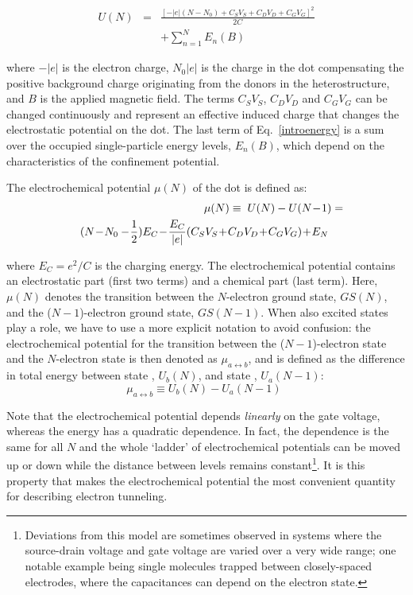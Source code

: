 \documentclass[12pt,aps,nofootinbib]{revtex4-1}
\begin{document}
\begin{eqnarray}
U(N) &=& \frac{[-|e|(N\!-\!N_0) + C_S V_{S}+C_D V_{D}+ C_G V_G]^2}{2C} \nonumber \\
&&+ \sum_{n=1}^N E_n(B) \label{introenergy}
\end{eqnarray}

\noindent where $-|e|$ is the electron charge, $N_0 |e|$ is the charge in the dot compensating the positive background charge originating from the donors in the heterostructure, and $B$ is the applied magnetic field. The terms $C_S V_{S}$, $C_D V_{D}$ and $C_G V_G$ can be changed continuously and represent an effective induced charge that changes the electrostatic potential on the dot. The last term of Eq.~\ref{introenergy} is a sum over the occupied single-particle energy levels, $E_n(B)$, which depend on the characteristics of the confinement potential.

The electrochemical potential $\mu(N)$ of the dot is defined as:
\begin{eqnarray}
&&\mu(N) \equiv \hspace{0.1cm} U(N) - U(N\!-\!1)= \nonumber \\
 &&(N\!-\! N_0 -\!\frac{1}{2})E_C\! -\! \frac{E_C}{|e|}
(C_S V_{S}\!+\! C_D V_{D}\! +\! C_G V_G)\! +\! E_N \ \ \ \ 
\label{mu}
\end{eqnarray}

\noindent where $E_C=e^2/C$ is the charging energy. The
electrochemical potential contains an electrostatic part (first
two terms) and a chemical part (last term). Here, $\mu(N)$ denotes
the transition between the $N$-electron ground state, $GS(N)$, and
the ($N\!-\!1$)-electron ground state, $GS(N\!-\!1)$. When also
excited states play a role, we have to use a more explicit
notation to avoid confusion: the electrochemical potential for the
transition between the ($N-1$)-electron state \ket{\:a} and the
$N$-electron state  is then denoted as
$\mu_{a\leftrightarrow b}$, and is defined as the difference in
total energy between state \ket{\:b}, $U_b(N)$, and state
, $U_a(N\!-\!1)$:
\begin{equation}
\mu_{a\leftrightarrow b} \equiv U_b(N) -U_a(N\!-\!1)\ \
\label{mu2}
\end{equation}

Note that the electrochemical potential depends \textit{linearly}
on the gate voltage, whereas the energy has a quadratic
dependence. In fact, the dependence is the same for all $N$ and
the whole `ladder' of electrochemical potentials can be moved up
or down while the distance between levels remains
constant\footnote{Deviations from this model are sometimes
observed in systems where the source-drain voltage and gate
voltage are varied over a very wide range; one notable example
being single molecules trapped between closely-spaced electrodes,
where the capacitances can depend on the electron state.}. It is
this property that makes the electrochemical potential the most
convenient quantity for describing electron tunneling.
\end{document}
